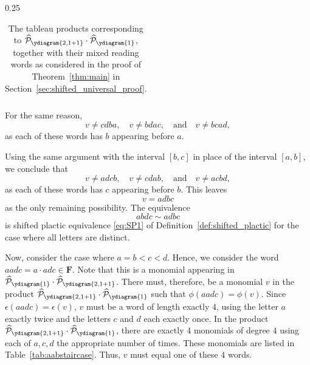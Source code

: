 \documentclass[12 pt]{amsart}
\newcommand{\Free}{\mathbf{F}}
\newcommand{\sFreeSchur}{\widehat{\mathcal{P}}}
\theoremstyle{remark}
\numberwithin{equation}{section}
\begin{document}
\begin{table}[p]
\begin{subtable}{0.25\textwidth}
\begin{tabular}{|c| c |}
		\end{tabular}
		\caption{Two repeated entries with the smallest letter repeated.}
		\label{tab:aabstaircase}
	\end{subtable} 
	\caption{The tableau products corresponding to $\sFreeSchur_{\ydiagram{2,1+1}} \cdot \sFreeSchur_{\ydiagram{1}}$, together with their mixed reading words as considered in the proof of Theorem~\ref{thm:main} in Section~\ref{sec:shifted_universal_proof}.}\label{tab:allthetables}
\end{table}


    
    For the same reason, 
    \[
    v \neq cdba, \quad v \neq bdac, \quad \text{and} \quad v \neq bcad,
    \]
    as each of these words has $b$ appearing before $a$.
    
    Using the same argument with the interval $[b,c]$ in place of the interval $[a,b]$, we conclude that 
     \[
    v \neq adcb, \quad v \neq cdab, \quad \text{and} \quad v \neq acbd,
    \]  as each of these words has $c$ appearing before $b$.
    This leaves 
    \[
    v = adbc
    \]
    as the only remaining possibility. The equivalence
    \[
     abdc \sim  adbc
    \]
    is
    shifted plactic equivalence \eqref{eq:SP1} of  Definition~\ref{def:shifted_plactic} for the case where all letters are distinct. 

    Now, consider the case where $a=b<c<d$. Hence, we consider the word $aadc = a \cdot adc \in \Free$. Note that this is a monomial appearing in $\sFreeSchur_{\ydiagram{1}}\cdot \sFreeSchur_{\ydiagram{2,1+1}}$. There must, therefore, be a monomial $v$ in the product $\sFreeSchur_{\ydiagram{2,1+1}} \cdot \sFreeSchur_{\ydiagram{1}}$ such that
   $\phi(aadc) = \phi(v)$.
   Since $\epsilon(aadc) = \epsilon(v)$, $v$ must be a word of length exactly $4$, using the letter $a$ exactly twice and the letters $c$ and $d$ each exactly once. In the product $\sFreeSchur_{\ydiagram{2,1+1}} \cdot \sFreeSchur_{\ydiagram{1}}$, there are exactly $4$ monomials of degree $4$ using each of $a,c,d$ the appropriate number of times. These monomials are listed in Table~\ref{tab:aabstaircase}. Thus, $v$ must equal one of these $4$ words.
\end{document}
